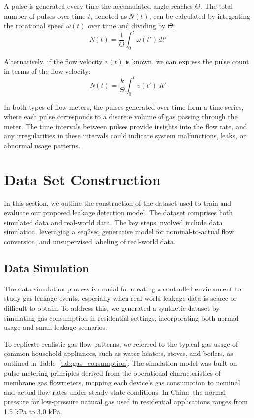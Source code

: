 \documentclass[10pt, sigconf]{acmart}
\begin{document}
A pulse is generated every time the accumulated angle reaches $\Theta$. The total number of pulses over time $t$, denoted as $N(t)$, can be calculated by integrating the rotational speed $\omega(t)$ over time and dividing by $\Theta$:
\begin{equation}
N(t) = \frac{1}{\Theta} \int_{0}^{t} \omega(t') \, dt'
\end{equation}

Alternatively, if the flow velocity $v(t)$ is known, we can express the pulse count in terms of the flow velocity:
\begin{equation}
   N(t) = \frac{k}{\Theta} \int_{0}^{t} v(t') \, dt'
\end{equation}

In both types of flow meters, the pulses generated over time form a time series, where each pulse corresponds to a discrete volume of gas passing through the meter. The time intervals between pulses provide insights into the flow rate, and any irregularities in these intervals could indicate system malfunctions, leaks, or abnormal usage patterns.

\section{Data Set Construction}

In this section, we outline the construction of the dataset used to train and evaluate our proposed leakage detection model. The dataset comprises both simulated data and real-world data. The key steps involved include data simulation, leveraging a seq2seq generative model for nominal-to-actual flow conversion, and unsupervised labeling of real-world data.

\subsection{Data Simulation}

The data simulation process is crucial for creating a controlled environment to study gas leakage events, especially when real-world leakage data is scarce or difficult to obtain. To address this, we generated a synthetic dataset by simulating gas consumption in residential settings, incorporating both normal usage and small leakage scenarios.

To replicate realistic gas flow patterns, we referred to the typical gas usage of common household appliances, such as water heaters, stoves, and boilers, as outlined in Table~\ref{tab:gas_consumption}. The simulation model was built on pulse metering principles derived from the operational characteristics of membrane gas flowmeters, mapping each device's gas consumption to nominal and actual flow rates under steady-state conditions. In China, the normal pressure for low-pressure natural gas used in residential applications ranges from 1.5 kPa to 3.0 kPa.
\end{document}
